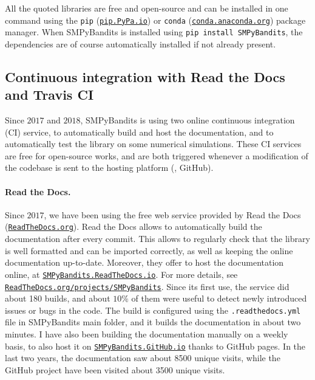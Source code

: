 All the quoted libraries are free and open-source and can be installed in one command using the \texttt{pip} (\texttt{\href{https://pip.pypa.io/}{pip.PyPa.io}}) or \texttt{conda} (\texttt{\href{http://conda.anaconda.org/}{conda.anaconda.org}}) package manager.
%
When SMPyBandits is installed using \texttt{pip install SMPyBandits}, the dependencies are of course automatically installed if not already present.


\subsection{Continuous integration with Read the Docs and Travis CI}

Since $2017$ and $2018$, SMPyBandits is using two online continuous integration (CI) service, to automatically build and host the documentation, and to automatically test the library on some numerical simulations.
%
These CI services are free for open-source works, and are both triggered whenever a modification of the codebase is sent to the hosting platform (\ie, GitHub).

\paragraph{Read the Docs.}
Since $2017$, we have been using the free web service provided by Read the Docs (\href{https://readthedocs.org/}{\texttt{ReadTheDocs.org}}).
Read the Docs allows to automatically build the documentation after every commit. This allows to regularly check that the library is well formatted and can be imported correctly, as well as keeping the online documentation up-to-date.
Moreover, they offer to host the documentation online, at \href{https://smpybandits.rtfd.io/}{\texttt{SMPyBandits.ReadTheDocs.io}}.
For more details, see \href{https://readthedocs.org/projects/smpybandits/}{\texttt{ReadTheDocs.org/projects/SMPyBandits}}.
%
Since its first use, the service did about 180 builds, and about $10\%$ of them were useful to detect newly introduced issues or bugs in the code.
The build is configured using the \texttt{.readthedocs.yml} file in SMPyBandits main folder, and it builds the documentation in about two minutes.
I have also been building the documentation manually on a weekly basis, to also host it on \href{https://smpybandits.github.io/}{\texttt{SMPyBandits.GitHub.io}} thanks to GitHub pages.
In the last two years, the documentation saw about 8500 unique visits, while the GitHub project have been visited about 3500 unique visits.


